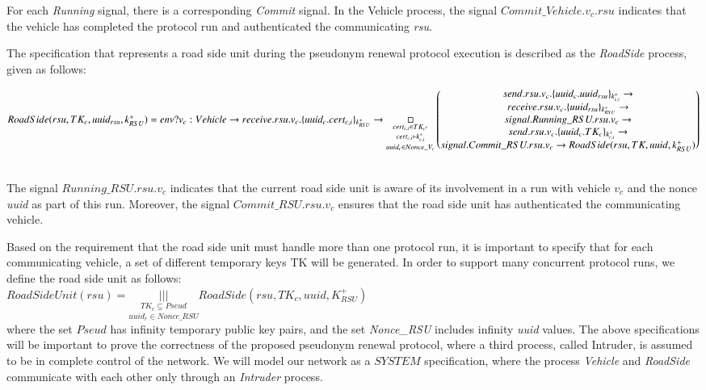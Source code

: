 \documentclass[preprint,12pt]{elsarticle}
\begin{document}
For each \textit{Running} signal, there is a corresponding \textit{Commit} signal. In the Vehicle process, the signal $Commit\_Vehicle.v_c.rsu$ indicates that the vehicle has completed the protocol run and authenticated the communicating \textit{rsu}.

The specification that represents a road side unit during the pseudonym renewal protocol execution is described as the \textit{RoadSide} process, given as follows: 
\\
\vspace{0,5cm}
\small{
\parbox[t]{1.2\textwidth}{$RoadSide(rsu, TK_c, uuid_{rsu}, k^{+}_{RSU}) = \\
env?v_c:Vehicle \rightarrow  receive.rsu.v_c.\{uuid_c.cert_{c, i}\}_{k^{+}_{RSU}} \rightarrow \\
  \underset{uuid_{c} \in Nonce\_{V_c}}{\underset{cert_{c, i} \vdash k^{+}_{c,i}}{\underset{ cert_{c, i} \in TK_{c'} }{\Box}}}
  \begin{pmatrix}
    send.rsu.v_c.\{uuid_c.uuid_{rsu}\}_{k^{+}_{c, i}} \rightarrow \\
    receive.rsu.v_c.\{ uuid_{rsu}\}_{k^{+}_{RSU}} \rightarrow \\
    signal.Running\_RSU.rsu.v_c \rightarrow \\
    send.rsu.v_c.\{ uuid_c.TK_c\}_{k^{+}_{c, i}} \rightarrow \\
    signal.Commit\_RSU.rsu.v_c \rightarrow RoadSide(rsu, TK, uuid, k^{+}_{RSU})
  \end{pmatrix}
$}}
\\
The signal $Running\_RSU.rsu.v_c$ indicates that the current road side unit is aware of its involvement in a run with vehicle $v_{c}$ and the nonce \textit{uuid} as part of this run. Moreover, the signal $Commit\_RSU.rsu.v_c$ ensures that the road side unit has authenticated the communicating vehicle.

Based on the requirement that the road side unit must handle more than one protocol run, it is important to specify that for each communicating vehicle, a set of different temporary keys TK will be generated. In order to support many concurrent protocol runs, we define the road side unit as follows:
\\

$RoadSideUnit(rsu) = \underset{uuid_r \in Nonce\_RSU}{\underset{TK_c \subseteq Pseud}{|||}} RoadSide(rsu, TK_c, uuid, K^{+}_{RSU})$
\\


\noindent where the set $Pseud$ has infinity temporary public key pairs, and the set \textit{Nonce\_RSU} includes infinity \textit{uuid} values. The above specifications will be important to prove the correctness of the proposed pseudonym renewal protocol, where a third process, called Intruder, is assumed to be in complete control of the network. We will model our network as a $SYSTEM$ specification, where the process \textit{Vehicle} and \textit{RoadSide} communicate with each other only through an  \textit{Intruder} process.
\end{document}
